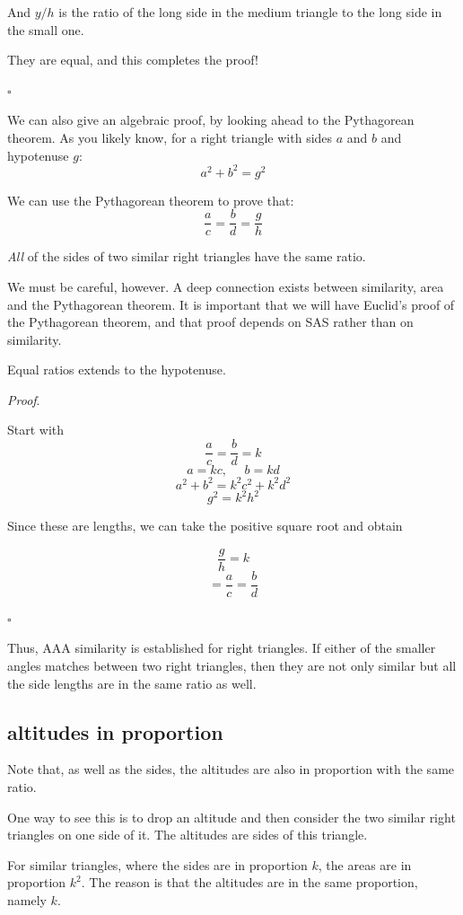 \documentclass[11pt, oneside]{article}
\begin{document}
And $y/h$ is the ratio of the long side in the medium triangle to the long side in the small one.

They are equal, and this completes the proof!

$\square$

We can also give an algebraic proof, by looking ahead to the Pythagorean theorem.  As you likely know, for a right triangle with sides $a$ and $b$ and hypotenuse $g$:
\[ a^2 + b^2 = g^2 \]

We can use the Pythagorean theorem to prove that:
\[ \frac{a}{c} = \frac{b}{d} = \frac{g}{h} \]

\emph{All} of the sides of two similar right triangles have the same ratio.  

We must be careful, however.  A deep connection exists between similarity, area and the Pythagorean theorem.  It is important that we will have Euclid's proof of the Pythagorean theorem, and that proof depends on SAS rather than on similarity.

Equal ratios extends to the hypotenuse.

\emph{Proof}.

Start with 
\[ \frac{a}{c} = \frac{b}{d} = k \]
\[ a = kc, \ \ \ \ \ \ b = kd \]
\[ a^2 + b^2 = k^2c^2 + k^2d^2 \]
\[ g^2 = k^2h^2 \]

Since these are lengths, we can take the positive square root and obtain

\[ \frac{g}{h} = k \]
\[ = \frac{a}{c} = \frac{b}{d} \]

$\square$

Thus, AAA similarity is established for right triangles.  If either of the smaller angles matches between two right triangles, then they are not only similar but all the side lengths are in the same ratio as well.

\subsection*{altitudes in proportion}

Note that, as well as the sides, the altitudes are also in proportion with the same ratio.

One way to see this is to drop an altitude and then consider the two similar right triangles on one side of it.  The altitudes are sides of this triangle.

For similar triangles, where the sides are in proportion $k$, the areas are in proportion $k^2$.  The reason is that the altitudes are in the same proportion, namely $k$.
\end{document}
